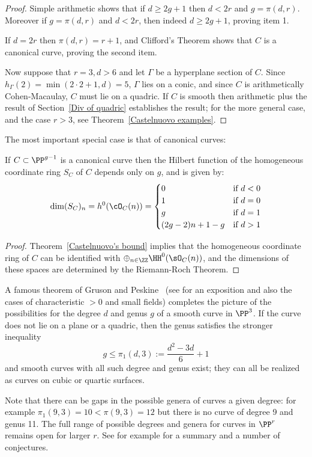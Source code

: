 \begin{proof}
Simple arithmetic shows that if $d\geq 2g+1$  then  $d<2r$ and $g= \pi(d,r)$. Moreover if $g= \pi(d,r)$ and $d<2r$,
then indeed $d\geq 2g+1$, proving item 1.

If $d= 2r$ then $\pi(d,r) = r+1$, and Clifford's Theorem shows that $C$ is a canonical curve, proving the second
item.

Now suppose that $r=3, d>6$ and let $\Gamma$ be a hyperplane 
section of $C$. Since $h_{\Gamma}(2) = \min(2\cdot 2+1, d) = 5$, $\Gamma$ lies on a conic, and 
since $C$ is arithmetically Cohen-Macaulay, $C$ must lie on a quadric. 
If $C$ is smooth then arithmetic plus the result of Section~\ref{Div of quadric} establishes the result; for the more general case,
and the case $r>3$, see Theorem~\ref{Castelnuovo examples}.
\end{proof}
The most important special case is that of canonical curves:

 \begin{corollary}\label{canonical hilbert function}
If $C\subset \PP^{g-1}$ is a canonical curve then the Hilbert function of the homogeneous coordinate ring $S_{C}$ of  $C$ depends only on $g$, and is given by:
$$
\dim({S_{C}})_{n} = h^{0}(\cO_{C}(n)) = 
\begin{cases}
 0 &\mbox {if } d<0\\
 1 & \mbox {if }  d=0\\
 g & \mbox {if }  d=1\\
 (2g-2)n + 1 - g & \mbox {if }  d>1\\
\end{cases}
$$
\end{corollary}
\begin{proof}
Theorem~\ref{Castelnuovo's bound} implies that the homogeneous coordinate ring of $C$ can be identified with $\oplus_{n\in \ZZ}\HH^0(\sO_C(n))$, and the dimensions of these spaces are determined by the Riemann-Roch Theorem.
\end{proof}


\begin{fact}
A famous theorem of Gruson and Peskine~\cite{MR0690647} (see \cite{MR0689536} for an exposition and also the cases of characteristic $>0$ and small fields) completes the picture of the possibilities for the degree $d$ and  genus $g$  of a smooth curve in $\PP^3$. If the curve does not lie on a plane or a quadric, then the genus satisfies the stronger inequality
$$
g\leq \pi_1(d,3) := \frac{d^2-3d}{6} +1
$$
and smooth curves with all such degree and genus exist; they can all be realized as curves
on cubic or quartic surfaces.

Note that there can be gaps in the possible genera of curves a given degree: for example  $\pi_1(9,3) = 10<\pi(9,3) =12$ but there is
no curve of degree 9 and genus 11. 
The full range of possible degrees and genera for curves in $\PP^r$ remains open for larger $r$. 
See for example \cite{MR0589222} for a summary and a number of conjectures.
\end{fact}



